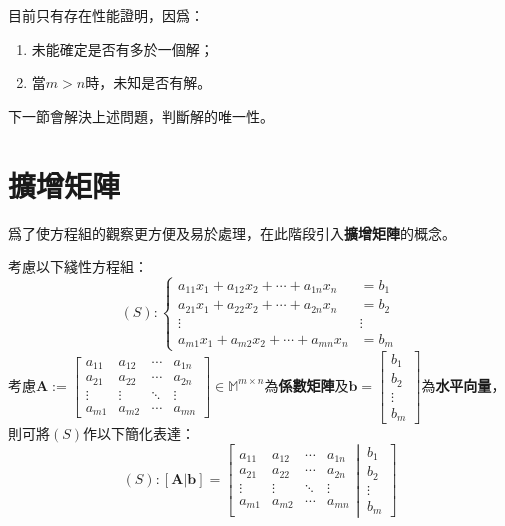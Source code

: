\documentclass[12pt]{article}
\begin{document}
    目前只有存在性能證明，因爲：\begin{enumerate}
        \item 未能確定是否有多於一個解；
        \item 當$m>n$時，未知是否有解。
    \end{enumerate}

    下一節會解決上述問題，判斷解的唯一性。

    \newpage

    \section*{擴增矩陣}

    爲了使方程組的觀察更方便及易於處理，在此階段引入\textbf{擴增矩陣}的概念。

    考慮以下綫性方程組：$$(S):\begin{cases}
        a_{11}x_1+a_{12}x_2+\cdots+a_{1n}x_{n}&=b_1\\
        a_{21}x_1+a_{22}x_2+\cdots+a_{2n}x_{n}&=b_2\\
        \vdots&\vdots\\
        a_{m1}x_1+a_{m2}x_2+\cdots+a_{mn}x_{n}&=b_m
    \end{cases}$$
    考慮$\mathbf{A}:=\begin{bmatrix}
        a_{11}&a_{12}&\cdots&a_{1n}\\
        a_{21}&a_{22}&\cdots&a_{2n}\\
        \vdots&\vdots&\ddots&\vdots\\
        a_{m1}&a_{m2}&\cdots&a_{mn}
    \end{bmatrix}\in\mathbb{M}^{m\times n}$為\textbf{係數矩陣}及$\mathbf{b}=\begin{bmatrix}
        b_1\\b_2\\\vdots\\b_m
    \end{bmatrix}$為\textbf{水平向量}，則可將$(S)$作以下簡化表達：$$(S):[\mathbf{A}\vert \mathbf{b}]=\left[
        \begin{matrix}
            a_{11}&a_{12}&\cdots&a_{1n}\\
            a_{21}&a_{22}&\cdots&a_{2n}\\
            \vdots&\vdots&\ddots&\vdots\\
            a_{m1}&a_{m2}&\cdots&a_{mn}
        \end{matrix}
        \left|
          \,
          \begin{matrix}
            b_1\\b_2\\\vdots\\b_m
          \end{matrix}
        \right.
      \right]$$
\end{document}
